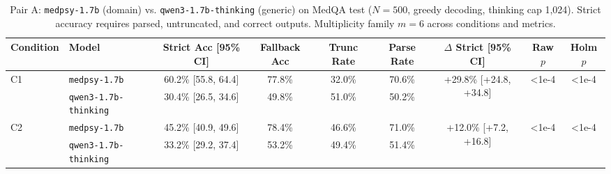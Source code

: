 \begin{table}[t]
\centering
\small
\caption{Pair A: \texttt{medpsy-1.7b} (domain) vs. \texttt{qwen3-1.7b-thinking} (generic) on MedQA test ($N=500$, greedy decoding, thinking cap 1,024). Strict accuracy requires parsed, untruncated, and correct outputs. Multiplicity family $m=6$ across conditions and metrics.}
\label{tab:pair_a_medqa}
\begin{tabular}{llccccccc}
\toprule
Condition & Model & Strict Acc [95\% CI] & Fallback Acc & Trunc Rate & Parse Rate & $\Delta$ Strict [95\% CI] & Raw $p$ & Holm $p$ \\
\midrule

C1 & \texttt{medpsy-1.7b} & 60.2\% [55.8, 64.4] & 77.8\% & 32.0\% & 70.6\% & \multirow{2}{*}{+29.8\% [+24.8, +34.8]} & \multirow{2}{*}{<1e-4} & \multirow{2}{*}{<1e-4} \\

 & \texttt{qwen3-1.7b-thinking} & 30.4\% [26.5, 34.6] & 49.8\% & 51.0\% & 50.2\% & & & \\

\midrule

C2 & \texttt{medpsy-1.7b} & 45.2\% [40.9, 49.6] & 78.4\% & 46.6\% & 71.0\% & \multirow{2}{*}{+12.0\% [+7.2, +16.8]} & \multirow{2}{*}{<1e-4} & \multirow{2}{*}{<1e-4} \\

 & \texttt{qwen3-1.7b-thinking} & 33.2\% [29.2, 37.4] & 53.2\% & 49.4\% & 51.4\% & & & \\

\bottomrule
\end{tabular}
\end{table}

